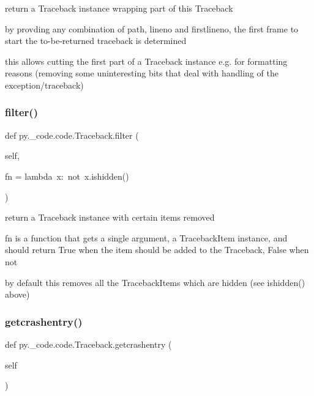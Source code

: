 \begin{DoxyVerb}return a Traceback instance wrapping part of this Traceback

    by provding any combination of path, lineno and firstlineno, the
    first frame to start the to-be-returned traceback is determined

    this allows cutting the first part of a Traceback instance e.g.
    for formatting reasons (removing some uninteresting bits that deal
    with handling of the exception/traceback)
\end{DoxyVerb}
 \mbox{\label{classpy_1_1__code_1_1code_1_1_traceback_a07aee95114669d9e65fef873c163553c}} 
\subsubsection{\texorpdfstring{filter()}{filter()}}
{\footnotesize\ttfamily def py.\+\_\+code.\+code.\+Traceback.\+filter (\begin{DoxyParamCaption}\item[{}]{self,  }\item[{}]{fn = {\ttfamily lambda~x\+:~not~x.ishidden()} }\end{DoxyParamCaption})}

\begin{DoxyVerb}return a Traceback instance with certain items removed

    fn is a function that gets a single argument, a TracebackItem
    instance, and should return True when the item should be added
    to the Traceback, False when not

    by default this removes all the TracebackItems which are hidden
    (see ishidden() above)
\end{DoxyVerb}
 \mbox{\label{classpy_1_1__code_1_1code_1_1_traceback_a9f0df5e06aa6de5e065fbc83c1efc7f8}} 
\subsubsection{\texorpdfstring{getcrashentry()}{getcrashentry()}}
{\footnotesize\ttfamily def py.\+\_\+code.\+code.\+Traceback.\+getcrashentry (\begin{DoxyParamCaption}\item[{}]{self }\end{DoxyParamCaption})}

